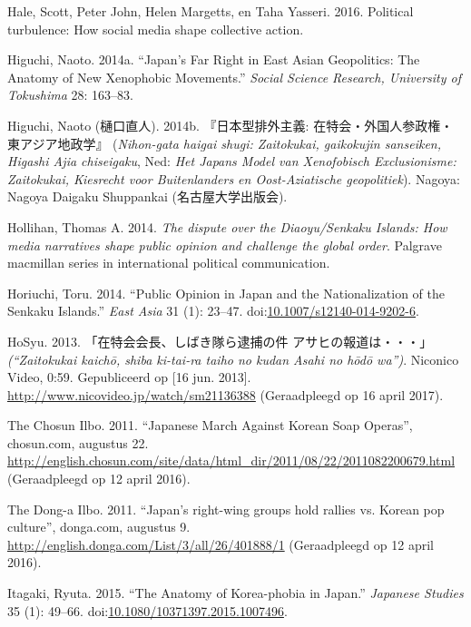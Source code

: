 \documentclass[10.5pt,dutch,]{article}
\begin{document}
\hypertarget{ref-haleux5fpoliticalux5f2016}{}
Hale, Scott, Peter John, Helen Margetts, en Taha Yasseri. 2016.
Political turbulence: How social media shape collective action.

\hypertarget{ref-higuchiux5fjapansux5f2014}{}
Higuchi, Naoto. 2014a. “Japan's Far Right in East Asian Geopolitics: The
Anatomy of New Xenophobic Movements.”  \emph{Social Science Research,
University of Tokushima} 28: 163--83.

\hypertarget{ref-higuchiux5fned:ux5f2014}{}
Higuchi, Naoto (樋口直人). 2014b. 『日本型排外主義: 在特会・外国人参政権・東アジア地政学』 (\emph{Nihon-gata haigai shugi: Zaitokukai, gaikokujin sanseiken, Higashi Ajia chiseigaku}, Ned: \emph{Het Japans Model van Xenofobisch Exclusionisme: Zaitokukai, Kiesrecht voor Buitenlanders en Oost-Aziatische geopolitiek}). Nagoya: Nagoya Daigaku Shuppankai (名古屋大学出版会).

\hypertarget{ref-hollihanux5fdisputeux5f2014}{}
Hollihan, Thomas A. 2014. \emph{The dispute over the Diaoyu/Senkaku
Islands: How media narratives shape public opinion and challenge the
global order}. Palgrave macmillan series in international political
communication.

\hypertarget{ref-horiuchiux5fpublicux5f2014}{}
Horiuchi, Toru. 2014. “Public Opinion in Japan and the Nationalization of
the Senkaku Islands.”  \emph{East Asia} 31 (1): 23--47.
doi:\href{https://doi.org/10.1007/s12140-014-9202-6}{10.1007/s12140-014-9202-6}.

\hypertarget{ref-hosyuux5fzaitokukaiux5f2013}{}
HoSyu. 2013.  「在特会会長、しばき隊ら逮捕の件 アサヒの報道は・・・」 \emph{(“Zaitokukai kaichō, shiba ki-tai-ra taiho no kudan Asahi no hōdō wa”)}. Niconico Video, 0:59. Gepubliceerd op [16 jun. 2013]. \url{http://www.nicovideo.jp/watch/sm21136388} (Geraadpleegd op 16 april 2017).

\hypertarget{ref-theux5fchosunux5filboux5fjapaneseux5f2011}{}
The Chosun Ilbo. 2011. “Japanese March Against Korean Soap Operas”, chosun.com, augustus 22.\url{ http://english.chosun.com/site/data/html_dir/2011/08/22/2011082200679.html} (Geraadpleegd op 12 april 2016).

\hypertarget{ref-theux5fdongaux5filboux5fjapansux5f2011}{}
The Dong-a Ilbo. 2011. “Japan’s right-wing groups hold rallies vs. Korean pop culture”, donga.com, augustus 9. \url{http://english.donga.com/List/3/all/26/401888/1} (Geraadpleegd op 12 april 2016).

\hypertarget{ref-itagakiux5fanatomyux5f2015}{}
Itagaki, Ryuta. 2015. “The Anatomy of Korea-phobia in Japan.” 
\emph{Japanese Studies} 35 (1): 49--66.
doi:\href{https://doi.org/10.1080/10371397.2015.1007496}{10.1080/10371397.2015.1007496}.
\end{document}
